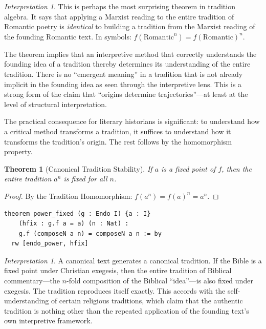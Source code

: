 \documentclass[11pt,openany]{book}
\theoremstyle{definition}
\theoremstyle{plain}
\newtheorem{theorem}[axiom]{Theorem}
\theoremstyle{remark}
\newtheorem{interpretation}[axiom]{Interpretation}
\begin{document}
\begin{interpretation}
This is perhaps the most surprising theorem in tradition algebra. It says that applying a Marxist reading to the entire tradition of Romantic poetry is \emph{identical} to building a tradition from the Marxist reading of the founding Romantic text. In symbols: $f(\text{Romantic}^n) = f(\text{Romantic})^n$.

The theorem implies that an interpretive method that correctly understands the founding idea of a tradition thereby determines its understanding of the entire tradition. There is no ``emergent meaning'' in a tradition that is not already implicit in the founding idea as seen through the interpretive lens. This is a strong form of the claim that ``origins determine trajectories''---at least at the level of structural interpretation.

The practical consequence for literary historians is significant: to understand how a critical method transforms a tradition, it suffices to understand how it transforms the tradition's origin. The rest follows by the homomorphism property.
\end{interpretation}

\begin{theorem}[Canonical Tradition Stability]
If $a$ is a fixed point of $f$, then the entire tradition $a^n$ is fixed for all $n$.
\end{theorem}

\begin{proof}
By the Tradition Homomorphism: $f(a^n) = f(a)^n = a^n$.
\end{proof}

\begin{lstlisting}[language=Lean4]
theorem power_fixed (g : Endo I) {a : I}
    (hfix : g.f a = a) (n : Nat) :
    g.f (composeN a n) = composeN a n := by
  rw [endo_power, hfix]
\end{lstlisting}

\begin{interpretation}
A canonical text generates a canonical tradition. If the Bible is a fixed point under Christian exegesis, then the entire tradition of Biblical commentary---the $n$-fold composition of the Biblical ``idea''---is also fixed under exegesis. The tradition reproduces itself exactly. This accords with the self-understanding of certain religious traditions, which claim that the authentic tradition is nothing other than the repeated application of the founding text's own interpretive framework.
\end{interpretation}
\end{document}
